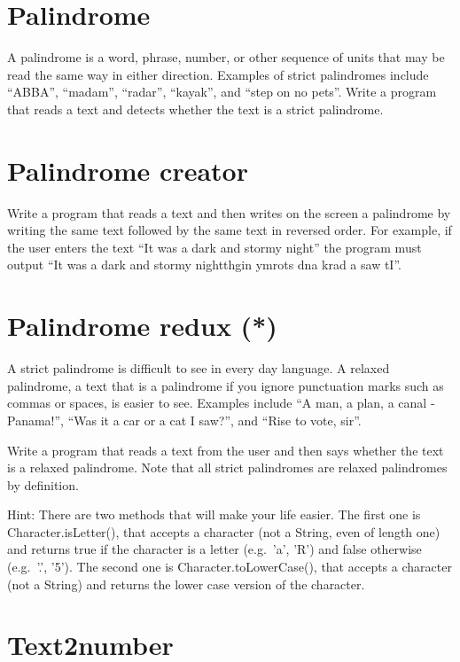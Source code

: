 \documentclass{article}
\begin{document}
\section{Palindrome}
\label{sec:palindrome}

A palindrome is a word, phrase, number, or other sequence of units
that may be read the same way in either direction. Examples of strict
palindromes include ``ABBA'', ``madam'', ``radar'', ``kayak'', and
``step on no pets''. Write a program
that reads a text and detects whether the text is a strict palindrome.

\section{Palindrome creator}
\label{sec:palindrome-creator}

Write a program that reads a text and then writes on the screen a
palindrome by writing the same text followed by the same text in
reversed order. For example, if the user enters the text ``It was a
dark and stormy night'' the program must output ``It was a dark and
stormy nightthgin ymrots dna krad a saw tI''. 

\section{Palindrome redux (*)}
\label{sec:palindrome-redux}

A strict palindrome is difficult to see in every day language. A
relaxed palindrome, a text that is a palindrome if you ignore
punctuation marks such as commas or spaces, is easier to see. Examples
include ``A man, a plan, a canal - Panama!'', ``Was it a car or a cat
I saw?'', and ``Rise to vote, sir''. 

Write a program that reads a text from the user and then says whether
the text is a relaxed palindrome. Note that all strict palindromes are
relaxed palindromes by definition. 

Hint: There are two methods that will make your life easier. The first
one is Character.isLetter(), that accepts a character (not a String,
even of length one) and returns true if the character is a letter
(e.g.~'a', 'R') and false otherwise (e.g.~'.', '5'). The second one is
Character.toLowerCase(), that accepts a character (not a String) and
returns the lower case version of the character. 

\section{Text2number}
\label{sec:text2number}
\end{document}
